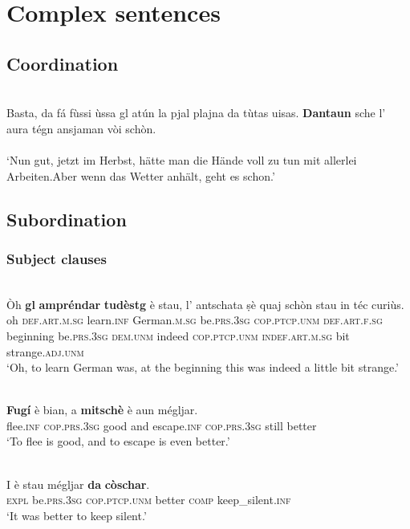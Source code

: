 \chapter{Complex sentences}

\section{Coordination}

\ea
\label{}
\\
\gll Basta, da fá fùssi ùssa gl atún la pjal plajna da tùtas uisas. \textbf{Dantaun} sche l' aura tégn ansjaman vòi schòn.\\
\\
\glt `Nun gut, jetzt im Herbst, hätte man die Hände voll zu tun mit allerlei Arbeiten.Aber wenn das Wetter anhält, geht es schon.'
\z


\section{Subordination}

\subsection{Subject clauses}


\ea
\label{}
\\
	\gll    Òh \textbf{gl} \textbf{ampréndar} \textbf{tudèstg} è stau, l’ antschata ṣè quaj schòn stau in téc curiùs.\\
oh \textsc{def.art.m.sg} learn.\textsc{inf} German.\textsc{m.sg} be.\textsc{prs.3sg}  \textsc{cop.ptcp.unm} \textsc{def.art.f.sg} beginning be.\textsc{prs.3sg} \textsc{dem.unm} indeed \textsc{cop.ptcp.unm} \textsc{indef.art.m.sg} bit strange.\textsc{adj.unm}\\
\glt `Oh, to learn German was, at the beginning this was indeed a little bit strange.'
\z

\ea
\label{}
\\
\gll \textbf{Fugí} è bian, a \textbf{mitschè} è aun mégljar. \\
   flee.\textsc{inf} \textsc{cop.prs.3sg} good and escape.\textsc{inf} \textsc{cop.prs.3sg} still better  \\
\glt `To flee is good, and to escape is even better.'
\z

\ea
\label{}
\\
\gll I è stau mégljar \textbf{da} \textbf{còschar}.\\
\textsc{expl} be.\textsc{prs.3sg} \textsc{cop.ptcp.unm} better \textsc{comp} keep\_silent.\textsc{inf}\\
\glt `It was better to keep silent.'
\z

